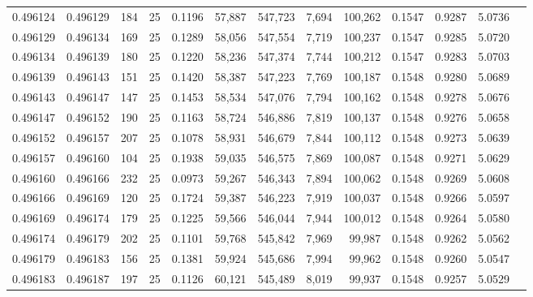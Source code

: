 \begin{tabular}{rrrrrrrrrrrrr}
0.496124 & 0.496129 & 184 &  25 &                                     0.1196 &  57,887 & 547,723 &   7,694 & 100,262 & 0.1547 & 0.9287 & 5.0736 \\
0.496129 & 0.496134 & 169 &  25 &                                     0.1289 &  58,056 & 547,554 &   7,719 & 100,237 & 0.1547 & 0.9285 & 5.0720 \\
0.496134 & 0.496139 & 180 &  25 &                                     0.1220 &  58,236 & 547,374 &   7,744 & 100,212 & 0.1547 & 0.9283 & 5.0703 \\
0.496139 & 0.496143 & 151 &  25 &                                     0.1420 &  58,387 & 547,223 &   7,769 & 100,187 & 0.1548 & 0.9280 & 5.0689 \\
0.496143 & 0.496147 & 147 &  25 &                                     0.1453 &  58,534 & 547,076 &   7,794 & 100,162 & 0.1548 & 0.9278 & 5.0676 \\
0.496147 & 0.496152 & 190 &  25 &                                     0.1163 &  58,724 & 546,886 &   7,819 & 100,137 & 0.1548 & 0.9276 & 5.0658 \\
0.496152 & 0.496157 & 207 &  25 &                                     0.1078 &  58,931 & 546,679 &   7,844 & 100,112 & 0.1548 & 0.9273 & 5.0639 \\
0.496157 & 0.496160 & 104 &  25 &                                     0.1938 &  59,035 & 546,575 &   7,869 & 100,087 & 0.1548 & 0.9271 & 5.0629 \\
0.496160 & 0.496166 & 232 &  25 &                                     0.0973 &  59,267 & 546,343 &   7,894 & 100,062 & 0.1548 & 0.9269 & 5.0608 \\
0.496166 & 0.496169 & 120 &  25 &                                     0.1724 &  59,387 & 546,223 &   7,919 & 100,037 & 0.1548 & 0.9266 & 5.0597 \\
0.496169 & 0.496174 & 179 &  25 &                                     0.1225 &  59,566 & 546,044 &   7,944 & 100,012 & 0.1548 & 0.9264 & 5.0580 \\
0.496174 & 0.496179 & 202 &  25 &                                     0.1101 &  59,768 & 545,842 &   7,969 &  99,987 & 0.1548 & 0.9262 & 5.0562 \\
0.496179 & 0.496183 & 156 &  25 &                                     0.1381 &  59,924 & 545,686 &   7,994 &  99,962 & 0.1548 & 0.9260 & 5.0547 \\
0.496183 & 0.496187 & 197 &  25 &                                     0.1126 &  60,121 & 545,489 &   8,019 &  99,937 & 0.1548 & 0.9257 & 5.0529 \\

\end{tabular}

